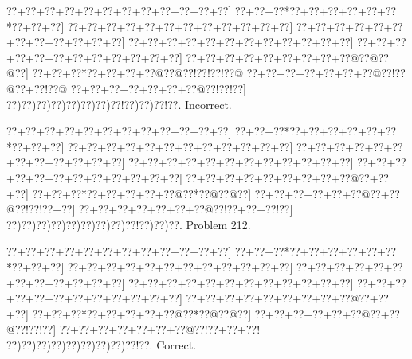 \documentclass[a5paper]{article}
\begin{document}
\begin{center}
{\goo
\0??+\0??+\0??+\0??+\0??+\0??+\0??+\0??+\0??+\0??+\0??+\0??]
\0??+\0??+\0??*\0??+\0??+\0??+\0??+\0??+\0??*\0??+\0??+\0??]
\0??+\0??+\0??+\0??+\0??+\0??+\0??+\0??+\0??+\0??+\0??+\0??]
\0??+\0??+\0??+\0??+\0??+\0??+\0??+\0??+\0??+\0??+\0??+\0??]
\0??+\0??+\0??+\0??+\0??+\0??+\0??+\0??+\0??+\0??+\0??+\0??]
\0??+\0??+\0??+\0??+\0??+\0??+\0??+\0??+\0??+\0??+\0??+\0??]
\0??+\0??+\0??+\0??+\0??+\0??+\0??+\0??+\0??@\0??@\0??@\0??]
\0??+\0??+\0??*\0??+\0??+\0??+\0??@\0??@\0??!\0??!\0??!\0??@
\0??+\0??+\0??+\0??+\0??+\0??+\0??@\0??!\0??@\0??+\0??!\0??@
\0??+\0??+\0??+\0??+\0??+\0??+\0??@\0??!\0??!\0??]
\0??)\0??)\0??)\0??)\0??)\0??)\0??)\0??!\0??)\0??)\0??!\0??.
}
Incorrect. 

\end{center}
\newpage
\begin{center}
{\goo
\0??+\0??+\0??+\0??+\0??+\0??+\0??+\0??+\0??+\0??+\0??+\0??]
\0??+\0??+\0??*\0??+\0??+\0??+\0??+\0??+\0??*\0??+\0??+\0??]
\0??+\0??+\0??+\0??+\0??+\0??+\0??+\0??+\0??+\0??+\0??+\0??]
\0??+\0??+\0??+\0??+\0??+\0??+\0??+\0??+\0??+\0??+\0??+\0??]
\0??+\0??+\0??+\0??+\0??+\0??+\0??+\0??+\0??+\0??+\0??+\0??]
\0??+\0??+\0??+\0??+\0??+\0??+\0??+\0??+\0??+\0??+\0??+\0??]
\0??+\0??+\0??+\0??+\0??+\0??+\0??+\0??+\0??@\0??+\0??+\0??]
\0??+\0??+\0??*\0??+\0??+\0??+\0??+\0??@\0??*\0??@\0??@\0??]
\0??+\0??+\0??+\0??+\0??+\0??@\0??+\0??@\0??!\0??!\0??+\0??]
\0??+\0??+\0??+\0??+\0??+\0??+\0??@\0??!\0??+\0??+\0??!\0??]
\0??)\0??)\0??)\0??)\0??)\0??)\0??)\0??)\0??!\0??)\0??)\0??.
}
Problem 212.

\end{center}
\begin{center}
{\goo
\0??+\0??+\0??+\0??+\0??+\0??+\0??+\0??+\0??+\0??+\0??+\0??]
\0??+\0??+\0??*\0??+\0??+\0??+\0??+\0??+\0??*\0??+\0??+\0??]
\0??+\0??+\0??+\0??+\0??+\0??+\0??+\0??+\0??+\0??+\0??+\0??]
\0??+\0??+\0??+\0??+\0??+\0??+\0??+\0??+\0??+\0??+\0??+\0??]
\0??+\0??+\0??+\0??+\0??+\0??+\0??+\0??+\0??+\0??+\0??+\0??]
\0??+\0??+\0??+\0??+\0??+\0??+\0??+\0??+\0??+\0??+\0??+\0??]
\0??+\0??+\0??+\0??+\0??+\0??+\0??+\0??+\0??@\0??+\0??+\0??]
\0??+\0??+\0??*\0??+\0??+\0??+\0??+\0??@\0??*\0??@\0??@\0??]
\0??+\0??+\0??+\0??+\0??+\0??@\0??+\0??@\0??!\0??!\0??]
\0??+\0??+\0??+\0??+\0??+\0??+\0??@\0??!\0??+\0??+\0??!
\0??)\0??)\0??)\0??)\0??)\0??)\0??)\0??)\0??!\0??.
}
Correct. 

\end{center}
\end{document}
